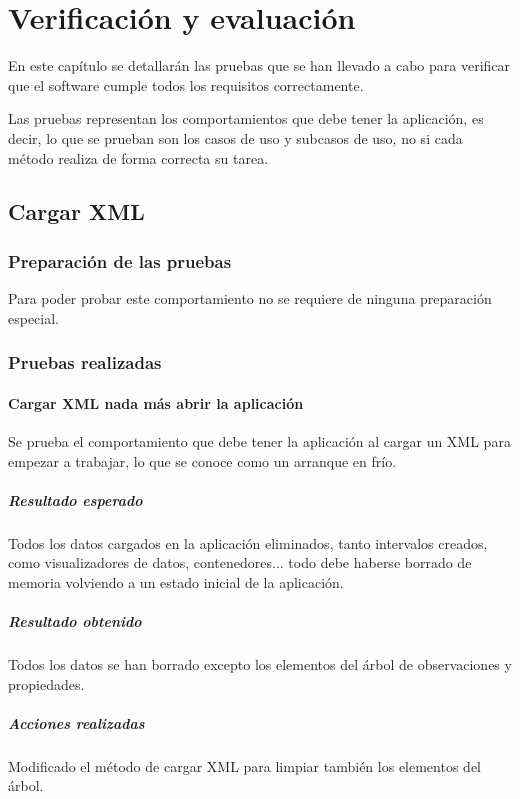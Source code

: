 \chapter{Verificaci\'{o}n y evaluaci\'{o}n}
En este cap\'itulo se detallar\'an las pruebas
que se han llevado a cabo para verificar que el software
cumple todos los requisitos correctamente.

Las pruebas representan los comportamientos que debe
tener la aplicaci\'on, es decir, lo que se prueban son los
casos de uso y subcasos de uso, no si cada m\'etodo
realiza de forma correcta su tarea.

\section{Cargar XML}

\subsection{Preparaci\'on de las pruebas}
Para poder probar este comportamiento no se requiere de ninguna preparaci\'on 
especial.

\subsection{Pruebas realizadas}
\subsubsection{Cargar XML nada m\'as abrir la aplicaci\'on}
Se prueba el comportamiento que debe tener la aplicaci\'on al cargar
un XML para empezar a trabajar, lo que se conoce como un arranque en fr\'io.

\paragraph{Resultado esperado}
Todos los datos cargados en la aplicaci\'on eliminados, 
tanto intervalos creados, como visualizadores de datos,
contenedores... todo debe haberse borrado de memoria volviendo a un estado inicial
de la aplicaci\'on.

\paragraph{Resultado obtenido}
Todos los datos se han borrado excepto los elementos del \'arbol de observaciones
y propiedades. 

\paragraph{Acciones realizadas}
Modificado el m\'etodo de cargar XML para limpiar tambi\'en los elementos del
\'arbol.

